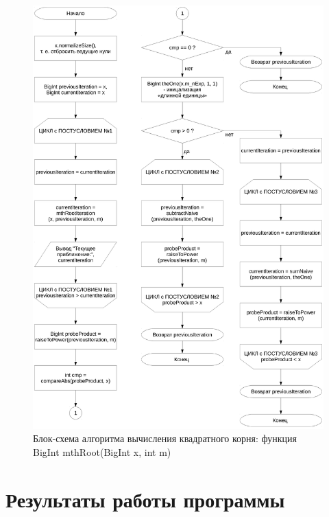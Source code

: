 \documentclass[a4paper,12pt]{article} %
\begin{document}
\begin{figure}[ht]
	\includegraphics[width=\textwidth]{lr6_mthRoot.pdf}
	\caption{Блок-схема алгоритма вычисления квадратного корня: функция BigInt mthRoot(BigInt x, int m)}
	\label{bs_mth_root}
\end{figure}

\clearpage

\section*{Результаты работы программы}
\end{document}
